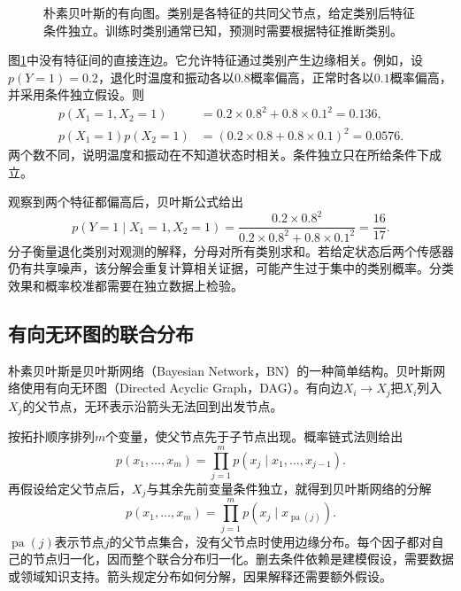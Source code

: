 \begin{figure}[htbp]
\centering
{}
\caption{朴素贝叶斯的有向图。类别是各特征的共同父节点，给定类别后特征条件独立。训练时类别通常已知，预测时需要根据特征推断类别。}
\label{fig:bayes-naive-structure}
\end{figure}

图\ref{fig:bayes-naive-structure}中没有特征间的直接连边。它允许特征通过类别产生边缘相关。例如，设$p(Y=1)=0.2$，退化时温度和振动各以$0.8$概率偏高，正常时各以$0.1$概率偏高，并采用条件独立假设。则
\begin{align}
 p(X_1=1,X_2=1)&=0.2\times0.8^2+0.8\times0.1^2=0.136,\\
 p(X_1=1)p(X_2=1)&=(0.2\times0.8+0.8\times0.1)^2=0.0576.
\end{align}
两个数不同，说明温度和振动在不知道状态时相关。条件独立只在所给条件下成立。

观察到两个特征都偏高后，贝叶斯公式给出
\begin{equation}
 p(Y=1\mid X_1=1,X_2=1)
 =\frac{0.2\times0.8^2}{0.2\times0.8^2+0.8\times0.1^2}
 =\frac{16}{17}.
\end{equation}
分子衡量退化类别对观测的解释，分母对所有类别求和。若给定状态后两个传感器仍有共享噪声，该分解会重复计算相关证据，可能产生过于集中的类别概率。分类效果和概率校准都需要在独立数据上检验。

\subsection{有向无环图的联合分布}
朴素贝叶斯是贝叶斯网络（Bayesian Network，BN）的一种简单结构。贝叶斯网络使用有向无环图（Directed Acyclic Graph，DAG）。有向边$X_i\to X_j$把$X_i$列入$X_j$的父节点，无环表示沿箭头无法回到出发节点。

按拓扑顺序排列$m$个变量，使父节点先于子节点出现。概率链式法则给出
\begin{equation}
 p(x_1,\ldots,x_m)=\prod_{j=1}^m p(x_j\mid x_1,\ldots,x_{j-1}).
\end{equation}
再假设给定父节点后，$X_j$与其余先前变量条件独立，就得到贝叶斯网络的分解
\begin{equation}
 p(x_1,\ldots,x_m)=\prod_{j=1}^m p(x_j\mid x_{\operatorname{pa}(j)}).
 \label{eq:bayes-dag-factorization}
\end{equation}
$\operatorname{pa}(j)$表示节点$j$的父节点集合，没有父节点时使用边缘分布。每个因子都对自己的节点归一化，因而整个联合分布归一化。删去条件依赖是建模假设，需要数据或领域知识支持。箭头规定分布如何分解，因果解释还需要额外假设。


